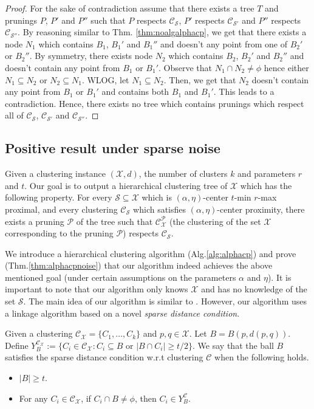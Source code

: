 \documentclass[anon,12pt]{colt2016} %
\newcommand{\mc}{\mathcal}
\begin{document}
\begin{proof}
For the sake of contradiction assume that there exists a tree $T$ and prunings $P$, $P'$ and $P''$ such that $P$ respects $\mc C_{\mc S}$, $P'$ respects $\mc C_{\mc S'}$ and $P''$ respects $\mc C_{\mc S''}$. By reasoning similar to Thm. \ref{thm:noalgalphacp}, we get that there exists a node $N_1$ which contains $B_1$, $B_1'$ and $B_1''$ and doesn't any point from one of $B_2'$ or $B_2''$. By symmetry, there exists node $N_2$ which contains $B_2$, $B_2'$ and $B_2''$ and doesn't contain any point from $B_1$ or $B_1'$. Observe that $N_1 \cap N_2 \neq \phi$ hence either $N_1 \subseteq N_2$ or $N_2 \subseteq N_1$. WLOG, let $N_1 \subseteq N_2$. Then, we get that $N_2$ doesn't contain any point from $B_1$ or $B_1'$ and contains both $B_1$ and $B_1'$. This leads to a contradiction. Hence, there exists no tree which contains prunings which respect all of $\mc C_{\mc S}$, $\mc C_{\mc S'}$ and $\mc C_{\mc S''}$.
\end{proof}

\subsection{Positive result under sparse noise}
\label{section:positiveResultSparseNoise}
Given a clustering instance $(\mc X, d)$, the number of clusters $k$ and parameters $r$ and $t$. Our goal is to output a hierarchical clustering tree of $\mc X$ which has the following property. For every $\mc S \subseteq \mc X$ which is $(\alpha, \eta)$-center $t$-min $r$-max proximal, and every clustering $\mc C_{\mc S}$ which satisfies $(\alpha, \eta)$-center proximity, there exists a pruning $\mc P$ of the tree such that $\mc C_{\mc X}^{\mc P}$ (the clustering of the set $\mc X$ corresponding to the pruning $\mc P$) respects $\mc C_{\mc S}$. 

We introduce a hierarchical clustering algorithm (Alg.\ref{alg:alphacp}) and prove (Thm.\ref{thm:alphacpnoise}) that our algorithm indeed achieves the above mentioned goal (under certain assumptions on the parameters $\alpha$ and $\eta$). It is important to note that our algorithm only knows $\mc X$ and has no knowledge of the set $\mc S$. The main idea of our algorithm is similar to \cite{balcan2012clustering}. However, our algorithm uses a linkage algorithm based on a novel {\it sparse distance condition}.

\begin{definition}
	 Given a clustering $\mc C_{\mc X}=\{C_1,\ldots,C_k\}$ and $p, q \in \mc X$. Let $B = B(p, d(p, q))$. Define $Y_B^{\mc C_{\mc X}} := \{C_i \in \mc C_{\mc X} : C_i \subseteq B \text{ or } |B \cap C_i| \ge t/2\}$. 
We say that the ball $B$ satisfies the sparse distance condition w.r.t clustering $\mc C$ when the following holds.
\begin{itemize}[noitemsep, leftmargin=*]
\item $|B| \ge t$.
\item For any $C_i \in \mc C_{\mc X}$, if $C_i \cap B \neq \phi$, then $C_i \in Y_B^{\mc C}$.
\end{itemize}
\end{definition}
\end{document}
